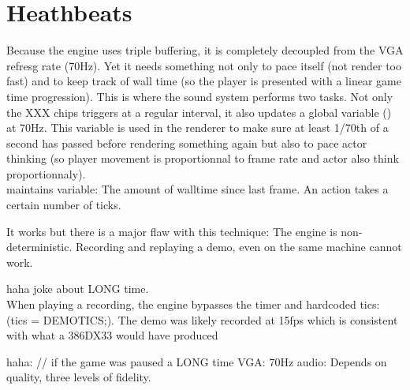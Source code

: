 \section{Heathbeats}
Because the engine uses triple buffering, it is completely decoupled from the VGA refresg rate (70Hz). Yet it needs something not only to pace itself (not render too fast) and to keep track of wall time (so the player is presented with a linear game time progression). This is where the sound system performs two tasks. Not only the XXX chips triggers at a regular interval, it also updates a global variable () at 70Hz. This variable is used in the renderer to make sure at least 1/70th of a second has passed before rendering something again but also to pace actor thinking (so player movement is proportionnal to frame rate and actor also think proportionnaly).\\
 maintains  variable: The amount of walltime since last frame. An action takes a certain number of ticks.\\
\par
It works but there is a major flaw with this technique: The engine is non-deterministic. Recording and replaying a demo, even on the same machine cannot work.\\\par
haha joke about LONG time.\\
 When playing a recording, the engine bypasses the timer and hardcoded tics: (tics = DEMOTICS;). The demo was likely recorded at 15fps which is consistent with what a 386DX33 would have produced

haha: // if the game was paused a LONG time
VGA: 70Hz
audio: Depends on quality, three levels of fidelity.
